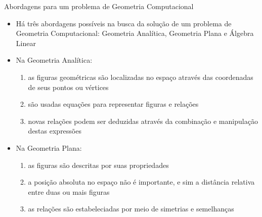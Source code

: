 \begin{frame}[fragile]{Abordagens para um problema de Geometria Computacional}

    \begin{itemize}
        \item Há três abordagens possíveis na busca da solução de um problema de Geometria
        Computacional: Geometria Analítica, Geometria Plana e Álgebra Linear
        \pause

        \item Na Geometria Analítica:
        \pause

        \begin{enumerate}
            \item as figuras geométricas são localizadas no espaço através das coordenadas de seus pontos ou vértices
        \pause
            \item são usadas equações para representar figuras e relações
        \pause
            \item novas relações podem ser deduzidas através da combinação e manipulação destas expressões
        \end {enumerate}
        \pause

        \item Na Geometria Plana: 
        \pause

        \begin{enumerate}
            \item as figuras são descritas por suas propriedades
        \pause
            \item a posição absoluta no espaço não é importante, e sim a distância relativa entre duas ou mais figuras
        \pause
            \item as relações são estabeleciadas por meio de simetrias e semelhanças
        \end{enumerate}
    \end{itemize}

\end{frame}

